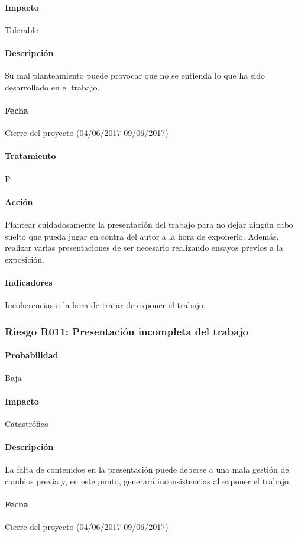 \documentclass[10pt,a4paper]{article}
\begin{document}
				\paragraph{Impacto}	Tolerable
				\paragraph{Descripción} Su mal planteamiento puede provocar que no se entienda lo que ha sido desarrollado en el trabajo. 
				\paragraph{Fecha} Cierre del proyecto (04/06/2017-09/06/2017)
				\paragraph{Tratamiento} P
				\paragraph{Acción} Plantear cuidadosamente la presentación del trabajo para no dejar ningún cabo suelto que pueda jugar en contra del autor a la hora de exponerlo. Además, realizar varias presentaciones de ser necesario realizando ensayos previos a la exposición.
				\paragraph{Indicadores} Incoherencias a la hora de tratar de exponer el trabajo.					

                \subsubsection{Riesgo R011: Presentación incompleta del trabajo}
				\paragraph{Probabilidad} Baja
				\paragraph{Impacto}	Catastrófico
				\paragraph{Descripción} La falta de contenidos en la presentación puede deberse a una mala gestión de cambios previa y, en este punto, generará inconsistencias al exponer el trabajo.
				\paragraph{Fecha} Cierre del proyecto (04/06/2017-09/06/2017)
\end{document}

